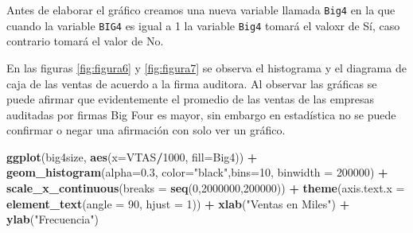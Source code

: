 \documentclass[letterpaper,]{book}
\newenvironment{Shaded}{\begin{snugshade}}{\end{snugshade}}
\newcommand{\DataTypeTok}[1]{\textcolor[rgb]{0.13,0.29,0.53}{#1}}
\newcommand{\DecValTok}[1]{\textcolor[rgb]{0.00,0.00,0.81}{#1}}
\newcommand{\FloatTok}[1]{\textcolor[rgb]{0.00,0.00,0.81}{#1}}
\newcommand{\KeywordTok}[1]{\textcolor[rgb]{0.13,0.29,0.53}{\textbf{#1}}}
\newcommand{\NormalTok}[1]{#1}
\newcommand{\OperatorTok}[1]{\textcolor[rgb]{0.81,0.36,0.00}{\textbf{#1}}}
\newcommand{\StringTok}[1]{\textcolor[rgb]{0.31,0.60,0.02}{#1}}
\begin{document}
Antes de elaborar el gráfico creamos una nueva variable llamada \texttt{Big4} en la que cuando la variable \texttt{BIG4} es igual a 1 la variable \texttt{Big4} tomará el valoxr de Sí, caso contrario tomará el valor de No.~

\begin{Shaded}
\end{Shaded}

En las figuras \ref{fig:figura6} y \ref{fig:figura7} se observa el histograma y el diagrama de caja de las ventas de acuerdo a la firma auditora. Al observar las gráficas se puede afirmar que evidentemente el promedio de las ventas de las empresas auditadas por firmas Big Four es mayor, sin embargo en estadística no se puede confirmar o negar una afirmación con solo ver un gráfico.

\begin{Shaded}
\begin{Highlighting}[]
\KeywordTok{ggplot}\NormalTok{(big4size, }\KeywordTok{aes}\NormalTok{(}\DataTypeTok{x=}\NormalTok{VTAS}\OperatorTok{/}\DecValTok{1000}\NormalTok{, }\DataTypeTok{fill=}\NormalTok{Big4)) }\OperatorTok{+}\StringTok{ }
\StringTok{  }\KeywordTok{geom_histogram}\NormalTok{(}\DataTypeTok{alpha=}\FloatTok{0.3}\NormalTok{, }\DataTypeTok{color=}\StringTok{"black"}\NormalTok{,}\DataTypeTok{bins=}\DecValTok{10}\NormalTok{, }\DataTypeTok{binwidth =} \DecValTok{200000}\NormalTok{) }\OperatorTok{+}
\StringTok{  }\KeywordTok{scale_x_continuous}\NormalTok{(}\DataTypeTok{breaks =} \KeywordTok{seq}\NormalTok{(}\DecValTok{0}\NormalTok{,}\DecValTok{2000000}\NormalTok{,}\DecValTok{200000}\NormalTok{)) }\OperatorTok{+}
\StringTok{  }\KeywordTok{theme}\NormalTok{(}\DataTypeTok{axis.text.x =} \KeywordTok{element_text}\NormalTok{(}\DataTypeTok{angle =} \DecValTok{90}\NormalTok{, }\DataTypeTok{hjust =} \DecValTok{1}\NormalTok{)) }\OperatorTok{+}
\StringTok{  }\KeywordTok{xlab}\NormalTok{(}\StringTok{"Ventas en Miles"}\NormalTok{) }\OperatorTok{+}\StringTok{ }\KeywordTok{ylab}\NormalTok{(}\StringTok{"Frecuencia"}\NormalTok{) }
\end{Highlighting}
\end{Shaded}
\end{document}
